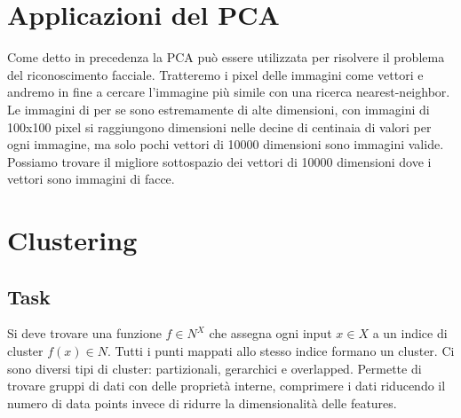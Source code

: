 		\section{Applicazioni del PCA}
		Come detto in precedenza la PCA pu\`o essere utilizzata per risolvere il problema del riconoscimento facciale. 
		Tratteremo i pixel delle immagini come vettori e andremo in fine a cercare l'immagine pi\`u simile con una ricerca nearest-neighbor. 
		Le immagini di per se sono estremamente di alte dimensioni, con immagini di 100x100 pixel si raggiungono dimensioni nelle decine di centinaia di valori per ogni immagine, ma solo pochi vettori di 10000 dimensioni sono immagini valide. 
		Possiamo trovare il migliore sottospazio dei vettori di 10000 dimensioni dove i vettori sono immagini di facce.

\section{Clustering}
	\subsection{Task}
	Si deve trovare una funzione $f\in N^X$ che assegna ogni input $x\in X$ a un indice di cluster $f(x)\in N$.
	Tutti i punti mappati allo stesso indice formano un cluster.
	Ci sono diversi tipi di cluster: partizionali, gerarchici e overlapped.
	Permette di trovare gruppi di dati con delle propriet\`a interne, comprimere i dati riducendo il numero di data points invece di ridurre la dimensionalit\`a delle features.	
	
